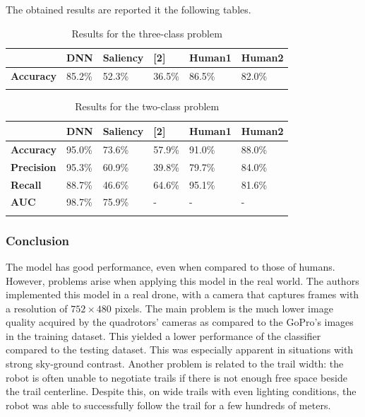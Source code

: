 The obtained results are reported it the following tables.

\begin{longtable}[]{@{}llllll@{}}

\toprule
& \textbf{DNN} & \textbf{Saliency} & \textbf{{[}2{]}} & \textbf{Human1}
& \textbf{Human2}\tabularnewline
\midrule
\endhead
\textbf{Accuracy} & 85.2\% & 52.3\% & 36.5\% & 86.5\% &
82.0\%\tabularnewline
\bottomrule
\caption{Results for the three-class problem}
\end{longtable}

\begin{longtable}[]{@{}llllll@{}}
\toprule
& \textbf{DNN} & \textbf{Saliency} & \textbf{{[}2{]}} & \textbf{Human1}
& \textbf{Human2}\tabularnewline
\midrule
\endhead
\textbf{Accuracy} & 95.0\% & 73.6\% & 57.9\% & 91.0\% &
88.0\%\tabularnewline
\textbf{Precision} & 95.3\% & 60.9\% & 39.8\% & 79.7\% &
84.0\%\tabularnewline
\textbf{Recall} & 88.7\% & 46.6\% & 64.6\% & 95.1\% &
81.6\%\tabularnewline
\textbf{AUC} & 98.7\% & 75.9\% & - & - & -\tabularnewline
\bottomrule
\caption{Results for the two-class problem}
\end{longtable}

\subsubsection{Conclusion}\label{header-n191}

The model has good performance, even when compared to those of humans.
However, problems arise when applying this model in the real world. The
authors implemented this model in a real drone, with a camera that
captures frames with a resolution of $752 \times 480$ pixels. The main problem
is the much lower image quality acquired by the quadrotors' cameras as
compared to the GoPro's images in the training dataset. This yielded a
lower performance of the classifier compared to the testing dataset.
This was especially apparent in situations with strong sky-ground
contrast. Another problem is related to the trail width: the robot is
often unable to negotiate trails if there is not enough free space
beside the trail centerline. Despite this, on wide trails with even
lighting conditions, the robot was able to successfully follow the trail
for a few hundreds of meters.